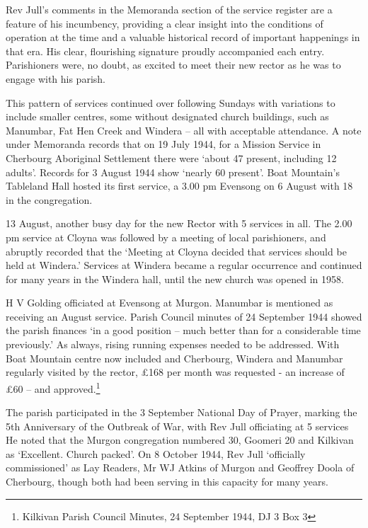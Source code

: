 Rev Jull's comments in the Memoranda section of the service register are a feature of his incumbency, providing a clear insight into the conditions of operation at the time and a valuable historical record of important happenings in that era. His clear, flourishing signature proudly accompanied each entry. Parishioners were, no doubt, as excited to meet their new rector as he was to engage with his parish.



This pattern of services continued over following Sundays with variations to include smaller centres, some without designated church buildings, such as Manumbar, Fat Hen Creek and Windera -- all with acceptable attendance. A note under Memoranda records that on 19 July 1944, for a Mission Service in Cherbourg Aboriginal Settlement there were `about 47 present, including 12 adults'. Records for 3 August 1944 show `nearly 60 present'. Boat Mountain's Tableland Hall hosted its first service, a 3.00 pm Evensong on 6 August with 18 in the congregation.



13 August, another busy day for the new Rector with 5 services in all. The 2.00 pm service at Cloyna was followed by a meeting of local parishioners, and abruptly recorded that the `Meeting at Cloyna decided that services should be held at Windera.' Services at Windera became a regular occurrence and continued for many years in the Windera hall, until the new church was opened in 1958.



H V Golding officiated at Evensong at Murgon. Manumbar is mentioned as receiving an August service. Parish Council minutes of 24 September 1944 showed the parish finances `in a good position -- much better than for a considerable time previously.' As always, rising running expenses needed to be addressed. With Boat Mountain centre now included and Cherbourg, Windera and Manumbar regularly visited by the rector, \pounds168 per month was requested - an increase of \pounds60 -- and approved.\footnote{Kilkivan Parish Council Minutes, 24 September 1944, DJ 3 Box 3}


The parish participated in the 3 September National Day of Prayer, marking the 5th Anniversary of the Outbreak of War, with Rev Jull officiating at 5 services He noted that the Murgon congregation numbered 30, Goomeri 20 and Kilkivan as `Excellent. Church packed'. On 8 October 1944, Rev Jull `officially commissioned' as Lay Readers, Mr WJ Atkins of Murgon and Geoffrey Doola of Cherbourg, though both had been serving in this capacity for many years.



